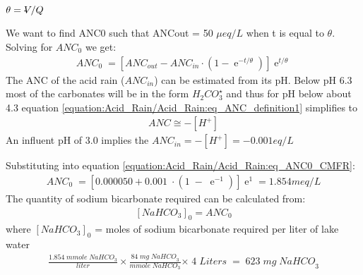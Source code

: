 \documentclass[letterpaper,10pt,english]{sphinxmanual}
\begin{document}
\(\theta = \rlap{-} V/Q\)

We want to find ANC0 such that ANCout = 50 \(\mu eq/L\) when t is equal to \(\theta\). Solving for \(ANC_{0}\) we get:
\begin{equation}\label{equation:Acid_Rain/Acid_Rain:eq_ANC0_CMFR}
\begin{split}{ANC}_{{0}} {\; }=\left[{ANC}_{out} - ANC_{in} \cdot \left(1 - {\mathop{e}\nolimits^{-t/\theta}} \right)\right]{\mathop{e}\nolimits^{t/\theta}}\end{split}
\end{equation}
The ANC of the acid rain (\(ANC_{in}\)) can be estimated from its pH. Below pH 6.3 most of the carbonates will be in the form \(H_2CO_3^{\star}\)  and thus for pH below about 4.3 equation \eqref{equation:Acid_Rain/Acid_Rain:eq_ANC_definition1} simplifies to
\begin{equation}\label{equation:Acid_Rain/Acid_Rain:Acid_Rain/Acid_Rain:7}
\begin{split}{ANC}\cong -\left[{H}^{+} \right]\end{split}
\end{equation}
An influent pH of 3.0 implies the \(ANC_{in} = -\left[H^+ \right] = -0.001 eq/L\)

Substituting into equation \eqref{equation:Acid_Rain/Acid_Rain:eq_ANC0_CMFR}:
\begin{equation}\label{equation:Acid_Rain/Acid_Rain:Acid_Rain/Acid_Rain:8}
\begin{split}{ANC}_{{0}} {\; }=\left[{0.000050}+{0.001\; }\cdot \left(1\; -\; {\mathop{e}\nolimits^{-1}} \right)\right]{\mathop{e}\nolimits^{1}} = 1.854 meq/L\end{split}
\end{equation}
The quantity of sodium bicarbonate required can be calculated from:
\begin{equation}\label{equation:Acid_Rain/Acid_Rain:Acid_Rain/Acid_Rain:9}
\begin{split}[NaHCO_3]_0 =ANC_0\end{split}
\end{equation}
where \([NaHCO_3]_0\) = moles of sodium bicarbonate required per liter of lake water
\begin{equation}\label{equation:Acid_Rain/Acid_Rain:Acid_Rain/Acid_Rain:10}
\begin{split}\frac{{1.854\; mmole\; NaHCO}_3 }{liter} {\times }\frac{{84\; mg\; NaHCO}_3 }{{mmole\; NaHCO}_3 } {\times \; 4\; Liters\; =\; 623\; mg\; NaHCO}_3\end{split}
\end{equation}
\end{document}

